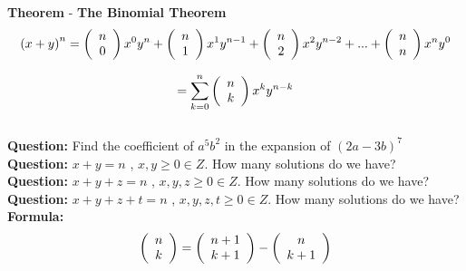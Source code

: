 \documentclass[11pt]{article}
\begin{document}
\textbf{Theorem} - \textbf{The Binomial Theorem}
$$\left({x+y}\right)^n = \left( {\begin{array}{*{20}c} n  \\ 0  \\ \end{array}} \right) x^0 y^n +  \left( {\begin{array}{*{20}c} n  \\ 1  \\ \end{array}} \right) x^1 y^{n-1} + \left( {\begin{array}{*{20}c} n  \\ 2 \\ \end{array}} \right) x^2 y^{n-2} + ... + \left( {\begin{array}{*{20}c} n  \\ n \\ \end{array}} \right) x^n y^0$$

$$= \sum\limits_{k = 0}^n {\left( {\begin{array}{*{20}c} n  \\ k  \\ \end{array}} \right) x^k y^{n-k}}$$
\\

\textbf{Question: } Find the coefficient of $a^5b^2$ in the expansion of  $\left(2a-3b\right)^7$
\\ %

\textbf{Question: }  $x+y = n$ , $x,y \geq 0 \in Z$. How many solutions do we have? 
\\ %

\textbf{Question: }  $x+y+z = n$ , $x,y,z \geq 0 \in Z$. How many solutions do we have?
\\ %

\textbf{Question: }  $x+y+z+t = n$ , $x,y,z,t \geq 0 \in Z$. How many solutions do we have?
\\ %

\textbf{Formula: }  $$\left( {\begin{array}{*{20}c} n  \\ k  \\ \end{array}} \right) = \left( {\begin{array}{*{20}c} n+1  \\ k+1  \\ \end{array}} \right) - \left( {\begin{array}{*{20}c} n  \\ k+1  \\ \end{array}} \right)$$
\end{document}
